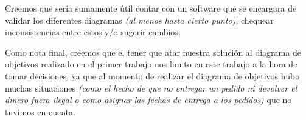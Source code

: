 Creemos que seria sumamente útil contar con un software que se encargara de validar los diferentes diagramas \textit{(al menos hasta cierto punto)}, chequear inconsistencias entre estos y/o sugerir cambios.

Como nota final, creemos que el tener que atar nuestra solución al diagrama de objetivos realizado en el primer trabajo nos limito en este trabajo a la hora de tomar decisiones, ya que al momento de realizar el diagrama de objetivos hubo muchas situaciones \textit{(como el hecho de que no entregar un pedido ni devolver el dinero fuera ilegal o como asignar las fechas de entrega a los pedidos)} que no tuvimos en cuenta.
